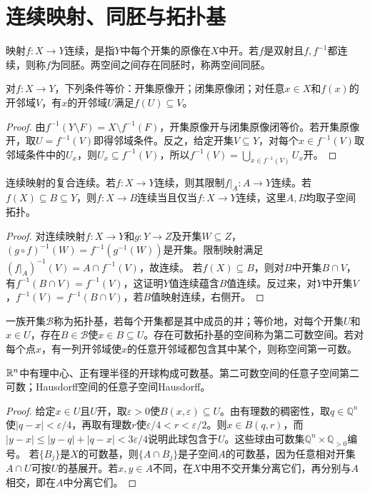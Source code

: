 \section{连续映射、同胚与拓扑基}
\begin{definition}[连续与同胚]
映射$f:X\to Y$连续，是指$Y$中每个开集的原像在$X$中开。若$f$是双射且$f,f^{-1}$都连续，则称$f$为同胚。两空间之间存在同胚时，称两空间同胚。
\end{definition}
\begin{theorem}[连续性的等价刻画]\label{thm:continuity}
对$f:X\to Y$，下列条件等价：开集原像开；闭集原像闭；对任意$x\in X$和$f(x)$的开邻域$V$，有$x$的开邻域$U$满足$f(U)\subseteq V$。
\end{theorem}
\begin{proof}
由$f^{-1}(Y\setminus F)=X\setminus f^{-1}(F)$，开集原像开与闭集原像闭等价。若开集原像开，取$U=f^{-1}(V)$即得邻域条件。反之，给定开集$V\subseteq Y$，对每个$x\in f^{-1}(V)$取邻域条件中的$U_x$，则$U_x\subseteq f^{-1}(V)$，所以$f^{-1}(V)=\bigcup_{x\in f^{-1}(V)}U_x$开。
\end{proof}
\begin{theorem}[复合、限制与取值于子空间]\label{thm:restrict}
连续映射的复合连续。若$f:X\to Y$连续，则其限制$f|_A:A\to Y$连续。若$f(X)\subseteq B\subseteq Y$，则$f:X\to B$连续当且仅当$f:X\to Y$连续，这里$A,B$均取子空间拓扑。
\end{theorem}
\begin{proof}
对连续映射$f:X\to Y$和$g:Y\to Z$及开集$W\subseteq Z$，$(g\circ f)^{-1}(W)=f^{-1}(g^{-1}(W))$是开集。限制映射满足$(f|_A)^{-1}(V)=A\cap f^{-1}(V)$，故连续。
若$f(X)\subseteq B$，则对$B$中开集$B\cap V$，有$f^{-1}(B\cap V)=f^{-1}(V)$，这证明$Y$值连续蕴含$B$值连续。反过来，对$Y$中开集$V$，$f^{-1}(V)=f^{-1}(B\cap V)$，若$B$值映射连续，右侧开。
\end{proof}
\begin{definition}[拓扑基与可数性]
一族开集$\mathcal B$称为拓扑基，若每个开集都是其中成员的并；等价地，对每个开集$U$和$x\in U$，存在$B\in\mathcal B$使$x\in B\subseteq U$。存在可数拓扑基的空间称为第二可数空间。若对每个点$x$，有一列开邻域使$x$的任意开邻域都包含其中某个，则称空间第一可数。
\end{definition}
\begin{theorem}[欧氏空间的可数基及其遗传性]\label{thm:countable-base}
$\mathbb{R}^n$中有理中心、正有理半径的开球构成可数基。第二可数空间的任意子空间第二可数；Hausdorff空间的任意子空间Hausdorff。
\end{theorem}
\begin{proof}
给定$x\in U$且$U$开，取$\varepsilon>0$使$B(x,\varepsilon)\subseteq U$。由有理数的稠密性，取$q\in\mathbb Q^n$使$|q-x|<\varepsilon/4$，再取有理数$r$使$\varepsilon/4<r<\varepsilon/2$。则$x\in B(q,r)$，而$|y-x|\leq|y-q|+|q-x|<3\varepsilon/4$说明此球包含于$U$。这些球由可数集$\mathbb Q^n\times\mathbb Q_{>0}$编号。
若$\{B_j\}$是$X$的可数基，则$\{A\cap B_j\}$是子空间$A$的可数基，因为任意相对开集$A\cap U$可按$U$的基展开。若$x,y\in A$不同，在$X$中用不交开集分离它们，再分别与$A$相交，即在$A$中分离它们。
\end{proof}
